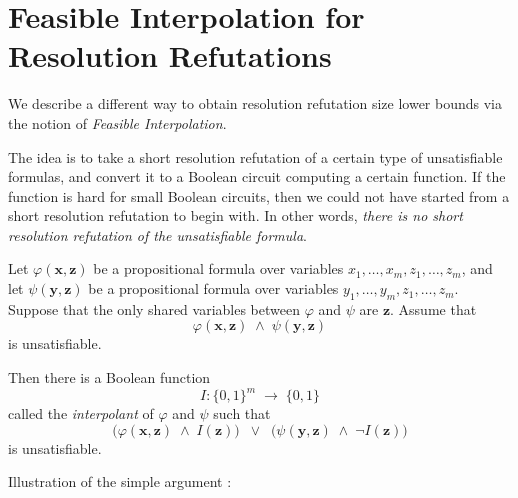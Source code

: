 \section{Feasible Interpolation for Resolution Refutations}
We describe a different way to obtain resolution refutation size lower bounds via the notion of \emph{Feasible Interpolation}. 

The idea is to take a short resolution refutation of a certain type of unsatisfiable formulas, and convert it to a Boolean circuit computing a certain function. If the function is hard for small Boolean circuits, then we could not have started from a short resolution refutation to begin with. In other words, \emph{there is no short resolution refutation of the unsatisfiable formula}.


\bigskip

\begin{theorem}
Let \(\varphi(\mathbf{x},\mathbf{z})\) be a propositional formula over variables \(x_{1},\dots,x_{m}, z_{1},\dots,z_{m}\), and let \(\psi(\mathbf{y},\mathbf{z})\) be a propositional formula over variables \(y_{1},\dots,y_{m}, z_{1},\dots,z_{m}\). 
Suppose that the only shared variables between \(\varphi\) and \(\psi\) are \(\mathbf{z}\). 
Assume that 
\[
\varphi(\mathbf{x},\mathbf{z}) \;\land\; \psi(\mathbf{y},\mathbf{z})
\]
is unsatisfiable.

Then there is a Boolean function 
\[
I \colon \{0,1\}^m \;\to\;\{0,1\}
\]
called the \emph{interpolant} of \(\varphi\) and \(\psi\) such that
\[
\bigl(\varphi(\mathbf{x},\mathbf{z}) \;\land\; I(\mathbf{z})\bigr)
\;\;\lor\;\;
\bigl(\psi(\mathbf{y},\mathbf{z}) \;\land\;\neg I(\mathbf{z})\bigr)
\]
is unsatisfiable.
\end{theorem}

Illustration of the simple argument :

